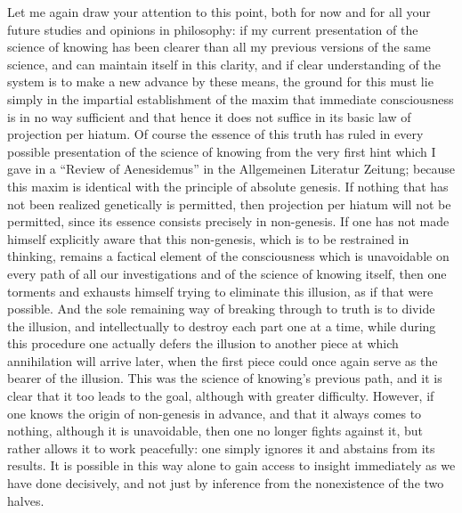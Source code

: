 Let me again draw your attention to this point,
both for now and for all your future
studies and opinions in philosophy:
if my current presentation of
the science of knowing has been clearer
than all my previous versions of the same science,
and can maintain itself in this clarity,
and if clear understanding of the system is
to make a new advance by these means,
the ground for this must lie simply
in the impartial establishment of
the maxim that immediate consciousness is
in no way sufficient and that hence
it does not suffice in its basic
law of projection per hiatum.
Of course the essence of this truth has ruled
in every possible presentation of
the science of knowing from the very first hint
which I gave in a “Review of Aenesidemus”
in the Allgemeinen Literatur Zeitung;
because this maxim is identical with
the principle of absolute genesis.
If nothing that has not been realized
genetically is permitted,
then projection per hiatum will not be permitted,
since its essence consists precisely in non-genesis.
If one has not made himself explicitly aware
that this non-genesis,
which is to be restrained in thinking,
remains a factical element of the consciousness
which is unavoidable on every path
of all our investigations
and of the science of knowing itself,
then one torments and exhausts himself
trying to eliminate this illusion,
as if that were possible.
And the sole remaining way of breaking through to
truth is to divide the illusion,
and intellectually to destroy each part one at a time,
while during this procedure one actually defers the illusion to
another piece at which annihilation will arrive later,
when the first piece could once again serve
as the bearer of the illusion.
This was the science of knowing's previous path,
and it is clear that it too leads to the goal,
although with greater difficulty.
However, if one knows the origin of non-genesis in advance,
and that it always comes to nothing,
although it is unavoidable, then one no longer fights against it,
but rather allows it to work peacefully:
one simply ignores it and abstains from its results.
It is possible in this way alone to gain
access to insight immediately as we have done decisively,
and not just by inference from the nonexistence of the two halves.


